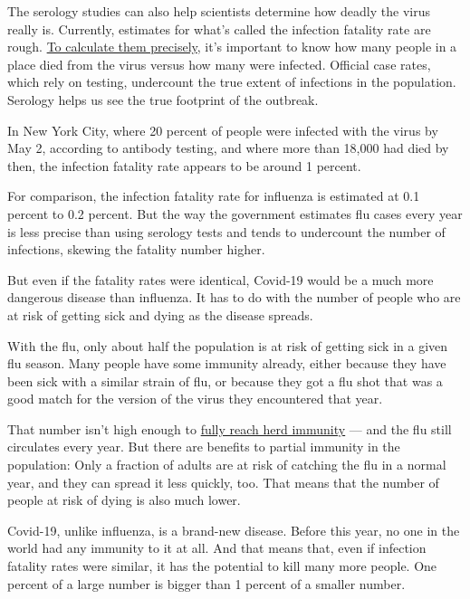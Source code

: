 The serology studies can also help scientists determine how deadly the
virus really is. Currently, estimates for what's called the infection
fatality rate are rough.
\href{https://www.nytimes3xbfgragh.onion/interactive/2020/03/07/upshot/how-deadly-is-coronavirus-what-we-know.html}{To
calculate them precisely}, it's important to know how many people in a
place died from the virus versus how many were infected. Official case
rates, which rely on testing, undercount the true extent of infections
in the population. Serology helps us see the true footprint of the
outbreak.

In New York City, where 20 percent of people were infected with the
virus by May 2, according to antibody testing, and where more than
18,000 had died by then, the infection fatality rate appears to be
around 1 percent.

For comparison, the infection fatality rate for influenza is estimated
at 0.1 percent to 0.2 percent. But the way the government estimates flu
cases every year is less precise than using serology tests and tends to
undercount the number of infections, skewing the fatality number higher.

But even if the fatality rates were identical, Covid-19 would be a much
more dangerous disease than influenza. It has to do with the number of
people who are at risk of getting sick and dying as the disease spreads.

With the flu, only about half the population is at risk of getting sick
in a given flu season. Many people have some immunity already, either
because they have been sick with a similar strain of flu, or because
they got a flu shot that was a good match for the version of the virus
they encountered that year.

That number isn't high enough to
\href{https://www.sciencedirect.com/science/article/pii/S0264410X18306571}{fully
reach herd immunity} --- and the flu still circulates every year. But
there are benefits to partial immunity in the population: Only a
fraction of adults are at risk of catching the flu in a normal year, and
they can spread it less quickly, too. That means that the number of
people at risk of dying is also much lower.

Covid-19, unlike influenza, is a brand-new disease. Before this year, no
one in the world had any immunity to it at all. And that means that,
even if infection fatality rates were similar, it has the potential to
kill many more people. One percent of a large number is bigger than 1
percent of a smaller number.

